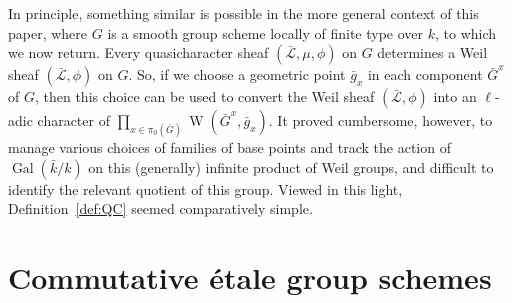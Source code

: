 \documentclass[11pt]{amsart}
\theoremstyle{plain}
\theoremstyle{definition}
\theoremstyle{remark}
\newcommand{\bFq}{\bar{k}}
\newcommand{\Fq}{k}
\DeclareMathOperator{\Gal}{Gal}
\DeclareMathOperator{\W}{W}
\newcommand{\gcs}[1]{{\mathcal{\bar #1}}}
\newcommand{\bG}{\bar{G}}
\begin{document}
In principle, something similar is possible in the more general 
context of this paper, where $G$ is a smooth group scheme 
locally of finite type over $\Fq$, to which we now return. 
Every quasicharacter sheaf $(\gcs{L},\mu,\phi)$ on $G$ 
determines a Weil sheaf $(\gcs{L},\phi)$ on $G$. 
So, if we choose a geometric point ${\bar g}_x$ in each component $\bG^x$ of $G$, then this choice can be used to convert 
the Weil sheaf $(\gcs{L},\phi)$ into an $\ell$-adic character of $\prod_{x\in \pi_0(\bG)}\W(\bG^x, {\bar g}_x)$. 
It proved cumbersome, however, to manage various 
choices of families of base points and track the action 
of $\Gal(\bFq/\Fq)$ on this (generally) infinite product of 
Weil groups, and difficult to identify the relevant quotient of this group. Viewed in this light, Definition~\ref{def:QC} seemed comparatively simple.

\section{Commutative \'etale group schemes} \label{sec:etale}

%
\end{document}
